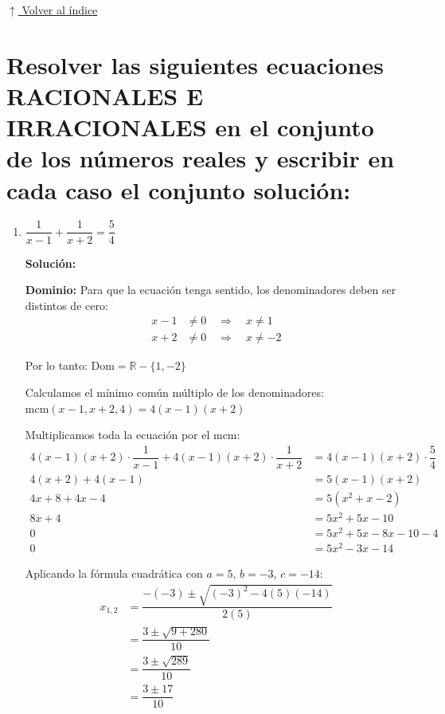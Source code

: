 \documentclass[12pt]{article}
\newcommand{\solucion}{%
    \vspace{0.8em}%
    \textbf{Solución:}%
}
\newcommand{\volverindice}{%
    \vspace{1em}%
    \begin{flushright}%
        \hyperlink{indice}{\small $\uparrow$ Volver al índice}%
    \end{flushright}%
}
\begin{document}
\volverindice

\newpage
\section[Ecuaciones racionales e irracionales]{Resolver las siguientes ecuaciones RACIONALES E IRRACIONALES en el conjunto de los números reales y escribir en cada caso el conjunto solución:}

\begin{enumerate}[label=\alph*.-]

    \item $\dfrac{1}{x-1} + \dfrac{1}{x+2} = \dfrac{5}{4}$

    \solucion

    \textbf{Dominio:} Para que la ecuación tenga sentido, los denominadores deben ser distintos de cero:
    \begin{align*}
    x - 1 &\neq 0 \quad \Rightarrow \quad x \neq 1 \\
    x + 2 &\neq 0 \quad \Rightarrow \quad x \neq -2
    \end{align*}

    Por lo tanto: $\text{Dom} = \mathbb{R} - \{1, -2\}$

    Calculamos el mínimo común múltiplo de los denominadores: $\text{mcm}(x-1, x+2, 4) = 4(x-1)(x+2)$

    Multiplicamos toda la ecuación por el mcm:
    \begin{align*}
    4(x-1)(x+2) \cdot \dfrac{1}{x-1} + 4(x-1)(x+2) \cdot \dfrac{1}{x+2} &= 4(x-1)(x+2) \cdot \dfrac{5}{4} \\[0.3em]
    4(x+2) + 4(x-1) &= 5(x-1)(x+2) \\[0.3em]
    4x + 8 + 4x - 4 &= 5(x^2 + x - 2) \\[0.3em]
    8x + 4 &= 5x^2 + 5x - 10 \\[0.3em]
    0 &= 5x^2 + 5x - 8x - 10 - 4 \\[0.3em]
    0 &= 5x^2 - 3x - 14
    \end{align*}

    Aplicando la fórmula cuadrática con $a = 5$, $b = -3$, $c = -14$:
    \begin{align*}
    x_{1,2} &= \dfrac{-(-3) \pm \sqrt{(-3)^2 - 4(5)(-14)}}{2(5)} \\[0.3em]
    &= \dfrac{3 \pm \sqrt{9 + 280}}{10} \\[0.3em]
    &= \dfrac{3 \pm \sqrt{289}}{10} \\[0.3em]
    &= \dfrac{3 \pm 17}{10}
    \end{align*}


\end{enumerate}
\end{document}
